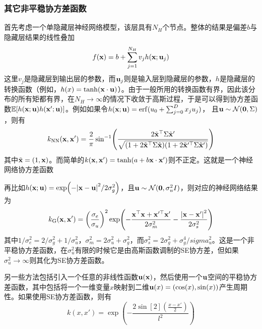 \documentclass[12pt,UTF8]{article}
\begin{document}
            \subsubsection{其它非平稳协方差函数}
                首先考虑一个单隐藏层神经网络模型，该层具有$N_H$个节点。整体的结果是偏差$b$与隐藏层结果的线性叠加
                \begin{equation}
                    f(\vb{x})=b+\sum_{j=1}^{N_H}{v_jh(\vb{x};\vb{u}_j)}
                \end{equation}
                这里$v_j$是隐藏层到输出层的参数，而$\vb{u}_j$则是输入层到隐藏层的参数，$h$是隐藏层的转换函数（例如，$h(x)=\tanh(\vb{x}\cdot\vb{u})$）。由于一般所用的转换函数有界，因此该分布的所有矩都有界，在$N_H\rightarrow\infty$的情况下收敛于高斯过程，于是可以得到协方差函数$\mathbb{E}[h(\vb{x};\vb{u})h(\vb{x}';\vb{u})]$。例如如果令$h(\vb{x};\vb{u})=\erf(u_0+\sum_{j=0}^D{x_ju_j})$， 且$\vb{u}\sim\mathcal{N}(\vb{0},\Sigma)$，则有
                \begin{equation}
                    k_{\mathrm{NN}}(\vb{x},\vb{x}')=\frac{2}{\pi}\sin[-1](\frac{2\tilde{\vb{x}}^\top\Sigma\tilde{\vb{x}}'}{\sqrt{(1+2\tilde{\vb{x}}^\top\Sigma\tilde{\vb{x}})(1+2\tilde{\vb{x}}'^\top\Sigma\tilde{\vb{x}}')}})
                \end{equation}
                其中$\tilde{\vb{x}}=(1,\vb{x})$。而简单的$k(\vb{x},\vb{x}')=\tanh(a+b\vb{x}\cdot\vb{x}')$则不正定。这就是一个神经网络协方差函数\par
                再比如$h(\vb{x};\vb{u})=\exp(-\abs{\vb{x}-\vb{u}}^2/2\sigma_g^2)$，且$\vb{u}\sim\mathcal{N}(\vb{0},\sigma_u^2I)$，则对应的神经网络结果为
                \begin{equation}
                    k_{\mathrm{G}}(\vb{x},\vb{x}')=\qty(\frac{\sigma_e}{\sigma_u})^2\exp(-\frac{\vb{x}^\top\vb{x}+\vb{x}'^\top\vb{x}'}{2\sigma_m^2}-\frac{\abs{\vb{x}-\vb{x}'}^2}{2\sigma_s^2})
                \end{equation}
                其中$1/\sigma_e^2=2/\sigma_g^2+1/\sigma_u^2$，$\sigma_m^2=2\sigma_u^2+\sigma_g^2$，而$\sigma_s^2=2\sigma_g^2+\sigma_g^4/sigma_u^2$。这是一个非平稳协方差函数，在$\sigma_u^2$有限的时候它是由高斯函数调制的SE协方差，但如果$\sigma_u^2\rightarrow\infty$则其化为SE协方差函数。\par
                另一些方法包括引入一个任意的非线性函数$\vb{u}(\vb{x})$，然后使用一个$\vb{u}$空间的平稳协方差函数，其中包括将一个一维变量$x$映射到二维$\vb{u}(x)=(\cos(x),\sin(x))$产生周期性。如果使用SE协方差函数，则有
                \begin{equation}
                    k(x,x')=\exp(-\frac{2\sin[2](\frac{x-x'}{2})}{l^2})
                \end{equation}\par
\end{document}
